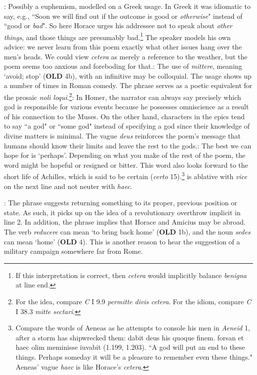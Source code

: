 : Possibly a euphemism, modelled on a Greek usage.  In Greek it was idiomatic to say, e.g.,  ``Soon we will find out if the outcome is good or \textit{otherwise}" instead of ``good or \textit{bad}".  So here Horace urges his addressee not to speak about \textit{other things}, and those things are presumably bad.\footnote{If this interpretation is correct, then \textit{cetera} would implicitly balance \textit{benigna} at line end.}  The speaker models his own advice: we never learn from this poem exactly what other issues hang over the men's heads.  We could view \textit{cetera} as merely a reference to the weather, but the poem seems too anxious and foreboding for that.\indent{}: The use of \textit{mittere}, meaning `avoid; stop' (\textbf{OLD} 4b),  with an infinitive may be colloquial.  The usage shows up a number of times in Roman comedy.  The phrase serves as a poetic equivalent for the prosaic \textit{noli loqui}.\footnote{For the idea, compare \textit{C} I 9.9 \textit{permitte divis cetera}. For the idiom, compare \textit{C} I 38.3 \textit{mitte sectari}.}\indent{}: In Homer, the narrator can always say precisely which god is responsible for various events because he possesses omniscience as a result of his connection to the Muses.  On the other hand, characters in the epics tend to say ``a god" or ``some god" instead of specifying a god since their knowledge of divine matters is minimal.  The vague \textit{deus} reinforces the poem's message that humans should know their limits and leave the rest to the gods.\indent{}: The best we can hope for is `perhaps'.  Depending on what you make of the rest of the poem, the word might be hopeful or resigned or bitter.  This word also looks forward to the short life of Achilles, which is said to be certain (\textit{certo} 15).\footnote{Compare the words of Aeneas as he attempts to console his men in \textit{Aeneid} 1, after a storm has shipwrecked them: dabit deus his quoque finem. \lips forsan et haec olim meminisse iuvabit (1.199, 1.203).  ``A god will put an end to these things. \lips Perhaps someday it will be a pleasure to remember even these things."  Aeneas' vague \textit{haec} is like Horace's \textit{cetera}.}\indent{} is ablative with \textit{vice} on the next line and not neuter with \textit{haec}.


: The phrase suggests returning something to its proper, previous position or state.  As such, it picks up on the idea of a revolutionary overthrow implicit in line 2.  In addition, the phrase implies that Horace and Amicius may be abroad.  The verb \textit{reducere} can mean `to bring back home' (\textbf{OLD} 1b), and the noun \textit{sedes} can mean `home' (\textbf{OLD} 4).  This is another reason to hear the suggestion of a military campaign somewhere far from Rome.


